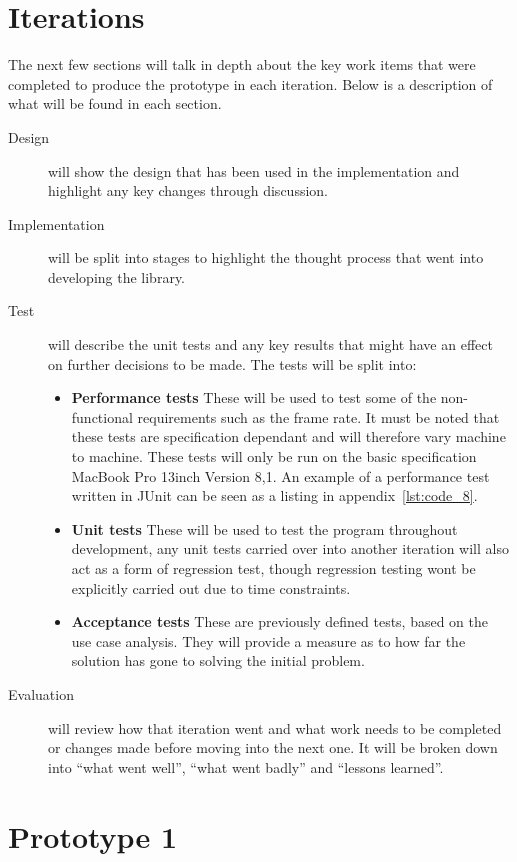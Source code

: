 \documentclass[11pt,oneside]{report}
\begin{document}
	\section{Iterations}
		The next few sections will talk in depth about the key work items that were completed to produce the prototype in each iteration.
		Below is a description of what will be found in each section.
		\begin{description}
		\item[Design] will show the design that has been used in the implementation and highlight any key changes through discussion.
		\item[Implementation] will be split into stages to highlight the thought process that went into developing the library.
		\item[Test] will describe the unit tests and any key results that might have an effect on further decisions to be made.
		The tests will be split into:
			\begin{itemize}
				\item \textbf{Performance tests} These will be used to test some of the non-functional requirements such as the frame rate. 
				It must be noted that these tests are specification dependant and will therefore vary machine to machine.
				These tests will only be run on the basic specification MacBook Pro 13inch Version 8,1.
				An example of a performance test written in JUnit can be seen as a listing in appendix~\ref{lst:code_8}.
				\item \textbf{Unit tests} These will be used to test the program throughout development, any unit tests carried over into another iteration will also act as a form of regression test, though regression testing wont be explicitly carried out due to time constraints.
				\item \textbf{Acceptance tests} These are previously defined tests, based on the use case analysis.
				They will provide a measure as to how far the solution has gone to solving the initial problem.
			\end{itemize}
		\item[Evaluation] will review how that iteration went and what work needs to be completed or changes made before moving into the next one. It will be broken down into ``what went well'', ``what went badly'' and ``lessons learned''.
		\end{description}
	\section{Prototype 1}\label{sec:p1}
\end{document}
